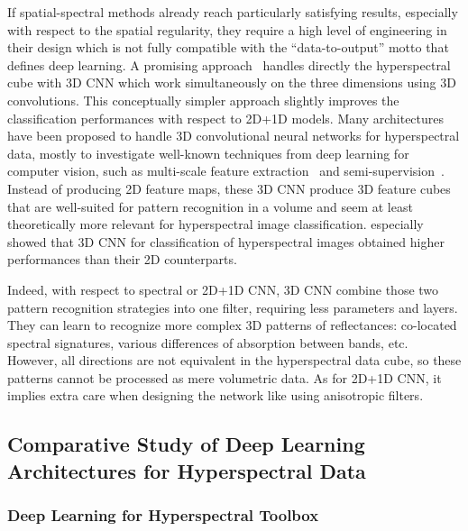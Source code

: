 \documentclass[journal]{IEEEtran}
\begin{document}
If spatial-spectral methods already reach particularly satisfying results, especially with respect to the spatial regularity, they require a high level of engineering in their design which is not fully compatible with the ``data-to-output'' motto that defines deep learning. A promising approach~\cite{li_spectralspatial_2017} handles directly the hyperspectral cube with 3D CNN which work simultaneously on the three dimensions using 3D convolutions. This conceptually simpler approach slightly improves the classification performances with respect to 2D+1D models. Many architectures have been proposed to handle 3D convolutional neural networks for hyperspectral data, mostly to investigate well-known techniques from deep learning for computer vision, such as multi-scale feature extraction~\cite{he_multi_2017} and semi-supervision~\cite{bing_semi_2017}. Instead of producing 2D feature maps, these 3D CNN produce 3D feature cubes that are well-suited for pattern recognition in a volume and seem at least theoretically more relevant for hyperspectral image classification. \cite{chen_deep_2016} especially showed that 3D CNN for classification of hyperspectral images obtained higher performances than their 2D counterparts.

Indeed, with respect to spectral or 2D+1D CNN, 3D CNN combine  those two pattern recognition strategies into one filter, requiring less parameters and layers. They can learn to recognize more complex 3D patterns of reflectances: co-located spectral signatures, various differences of absorption between bands, etc. However, all directions are not equivalent in the hyperspectral data cube, so these patterns cannot be processed as mere volumetric data. As for 2D+1D CNN, it implies extra care when designing the network like using anisotropic filters.














\subsection{Comparative Study of Deep Learning Architectures for Hyperspectral Data}
\subsubsection{Deep Learning for Hyperspectral Toolbox}
\end{document}
